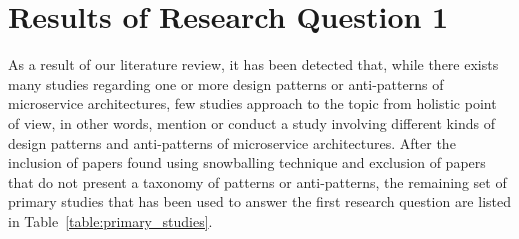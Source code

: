 \documentclass{Configuration_Files/PoliMi3i_thesis}
\begin{document}
\chapter{Results of Research Question 1}
\label{ch:classification_result}%

As a result of our literature review, it has been detected that, while there exists many studies regarding one or more design patterns or anti-patterns of microservice architectures, few studies approach to the topic from holistic point of view, in other words, mention or conduct a study involving different kinds of design patterns and anti-patterns of microservice architectures.
After the inclusion of papers found using snowballing technique and exclusion of papers that do not present a taxonomy of patterns or anti-patterns, the remaining set of primary studies that has been used to answer the first research question are listed in Table~\ref{table:primary_studies}. 
\end{document}
